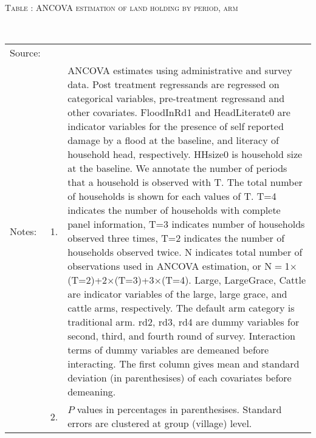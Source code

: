 \hspace{-1cm}\begin{minipage}[t]{14cm}
\hfil\textsc{\normalsize Table \thetable: ANCOVA estimation of land holding by period, arm\label{tab ANCOVA land period}}\\
\setlength{\tabcolsep}{1pt}
\setlength{\baselineskip}{8pt}
\renewcommand{\arraystretch}{.55}
\hfil{}\\
\renewcommand{\arraystretch}{.8}
\setlength{\tabcolsep}{1pt}
\begin{tabular}{>{\hfill\scriptsize}p{1cm}<{}>{\hfill\scriptsize}p{.25cm}<{}>{\scriptsize}p{12cm}<{\hfill}}
Source:& \multicolumn{2}{l}{\scriptsize Estimated with GUK administrative and survey data.}\\
Notes: & 1. & ANCOVA estimates using administrative and survey data. Post treatment regressands are regressed on categorical variables, pre-treatment regressand and other covariates. \textsf{FloodInRd1} and \textsf{HeadLiterate0} are indicator variables for the presence of self reported damage by a flood at the baseline, and literacy of household head, respectively. \textsf{HHsize0} is household size at the baseline. We annotate the number of periods that a household is observed with \textsf{T}. The total number of households is shown for each values of \textsf{T}. \textsf{T=4} indicates the number of households with complete panel information, \textsf{T=3} indicates number of households observed three times, \textsf{T=2} indicates the number of households observed twice. \textsf{N} indicates total number of observations used in ANCOVA estimation, or \textsf{N$=$1$\times$(T=2)+2$\times$(T=3)+3$\times$(T=4)}.  \textsf{Large}, \textsf{LargeGrace}, \textsf{Cattle} are indicator variables of the \textsf{large}, \textsf{large grace}, and \textsf{cattle} arms, respectively. The default arm category is \textsf{traditional} arm. \textsf{rd2, rd3, rd4} are dummy variables for second, third, and fourth round of survey. Interaction terms of dummy variables are demeaned before interacting. The first column gives mean and standard deviation (in parenthesises) of each covariates before demeaning.\\
& 2. & $P$ values in percentages in parenthesises. Standard errors are clustered at group (village) level.
\end{tabular}
\end{minipage}

